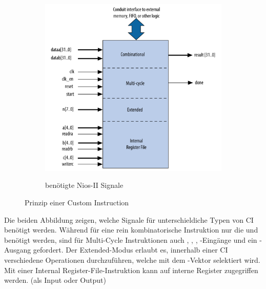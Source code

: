 \begin{figure}[ht!]
\begin{subfigure}[b]{0.4\textwidth}
{      \includegraphics[height=.3\textheight]{pic/custom_instruction_signals.png}}
\caption{benötigte Nios-II Signale}
 \end{subfigure}
 \caption{Prinzip einer Custom Instruction}
\end{figure}
Die beiden Abbildung zeigen, welche Signale für unterschieldiche Typen von CI benötigt werden. 
Während für eine rein kombinatorische Instruktion nur die  und  benötigt werden, sind für Multi-Cycle Instruktionen auch , , , -Eingänge und ein -Ausgang gefordert. Der Extended-Modus erlaubt es, innerhalb einer CI verschiedene Operationen durchzuführen, welche mit dem -Vektor selektiert wird. Mit einer Internal Register-File-Instruktion kann auf interne Register zugegriffen werden. (als Input oder Output)
